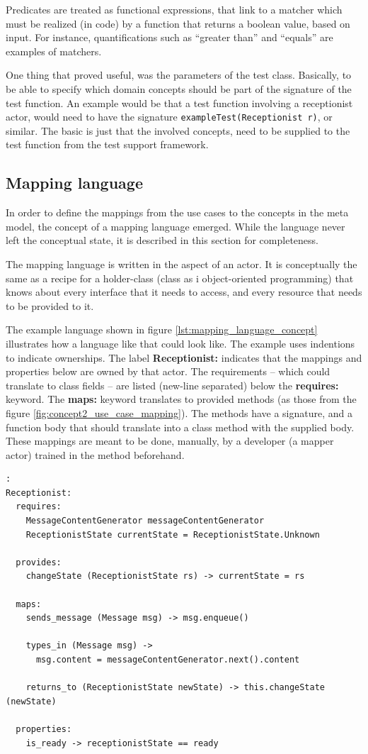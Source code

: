 \noindent 
Predicates are treated as functional expressions, that link to a matcher which must be realized (in code) by a function that returns a boolean value, based on input. For instance, quantifications such as ``greater than'' and ``equals'' are examples of matchers.\medskip

\noindent 
One thing that proved useful, was the parameters of the test class. Basically, to be able to specify which domain concepts should be part of the signature of the test function. An example would be that a test function involving a receptionist actor, would need to have the signature \texttt{exampleTest(Receptionist r)}, or similar. The basic is just that the involved concepts, need to be supplied to the test function from the test support framework.
\subsection{Mapping language}
In order to define the mappings from the use cases to the concepts in the meta model, the concept of a mapping language emerged. While the language never left the conceptual state, it is described in this section for completeness.\medskip

\noindent The mapping language is written in the aspect of an actor. It is conceptually the same as a recipe for a holder-class (class as i object-oriented programming) that knows about every interface that it needs to access, and every resource that needs to be provided to it.\medskip

\noindent The example language shown in figure \ref{lst:mapping_language_concept} illustrates how a language like that could look like. The example uses indentions to indicate ownerships. The label \textbf{Receptionist:} indicates that the mappings and properties below are owned by that actor. The requirements -- which could translate to class fields -- are listed (new-line separated) below the \textbf{requires:} keyword. The \textbf{maps:} keyword translates to provided methods (as those from the figure \ref{fig:concept2_use_case_mapping}). The methods have a signature, and a function body that should translate into a class method with the supplied body. These mappings are meant to be done, manually, by a developer (a mapper actor) trained in the method beforehand.\medskip

\begin{lstlisting}[caption=Example language for mapping concepts,label={lst:mapping_language_concept}]:
Receptionist:
  requires:
    MessageContentGenerator messageContentGenerator
    ReceptionistState currentState = ReceptionistState.Unknown
  
  provides:
    changeState (ReceptionistState rs) -> currentState = rs
  
  maps:
    sends_message (Message msg) -> msg.enqueue()

    types_in (Message msg) -> 
      msg.content = messageContentGenerator.next().content
    
    returns_to (ReceptionistState newState) -> this.changeState (newState)

  properties:
    is_ready -> receptionistState == ready
\end{lstlisting}


